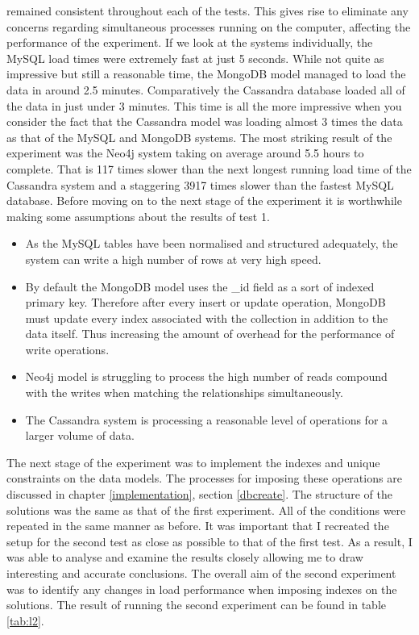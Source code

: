 \parindent 0pt
remained consistent throughout each of the tests. This gives rise to eliminate any concerns regarding simultaneous processes running on the computer, affecting the performance of the experiment.
\parindent 15pt
If we look at the systems individually, the MySQL load times were extremely fast at just 5 seconds. While not quite as impressive but still a reasonable time, the MongoDB model managed to load the data in around 2.5 minutes. Comparatively the Cassandra database loaded all of the data in just under 3 minutes. This time is all the more impressive when you consider the fact that the Cassandra model was loading almost 3 times the data as that of the MySQL and MongoDB systems. The most striking result of the experiment was the Neo4j system taking on average around 5.5 hours to complete. That is 117 times slower than the next longest running load time of the Cassandra system and a staggering 3917 times slower than the fastest MySQL database. Before moving on to the next stage of the experiment it is worthwhile making some assumptions about the results of test 1.
\begin{itemize}
\item As the MySQL tables have been normalised and structured adequately, the system can write a high number of rows at very high speed.
\item By default the MongoDB model uses the \_id field as a sort of indexed primary key. Therefore after every insert or update operation, MongoDB must update every index associated with the collection in addition to the data itself. Thus increasing the amount of overhead for the performance of write operations.
\item Neo4j model is struggling to process the high number of reads compound with the writes when matching the relationships simultaneously.
\item The Cassandra system is processing a reasonable level of operations for a larger volume of data.
\end{itemize}

The next stage of the experiment was to implement the indexes and unique constraints on the data models. The processes for imposing these operations are discussed in chapter \ref{implementation}, section \ref{dbcreate}. The structure of the solutions was the same as that of the first experiment. All of the conditions were repeated in the same manner as before. It was important that I recreated the setup for the second test as close as possible to that of the first test. As a result, I was able to analyse and examine the results closely allowing me to draw interesting and accurate conclusions. The overall aim of the second experiment was to identify any changes in load performance when imposing indexes on the solutions. The result of running the second experiment can be found in table \ref{tab:l2}.

